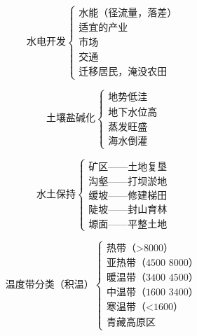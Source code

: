 \documentclass[UTF8]{ctexart}
\begin{document}
\begin{multicols}{2}

    \[
        \textbf{水电开发}
        \begin{cases}
            \text{水能（径流量，落差）}\\
            \text{适宜的产业}\\
            \text{市场}\\
            \text{交通}\\
            \text{迁移居民，淹没农田}
        \end{cases}
    \]

    \[
        \textbf{土壤盐碱化}
        \begin{cases}
            \text{地势低洼}\\
            \text{地下水位高}\\
            \text{蒸发旺盛}\\
            \text{海水倒灌}
        \end{cases}
    \]

\end{multicols}

\par

\begin{multicols}{2}

    \[
        \textbf{水土保持}
        \begin{cases}
            \text{矿区——土地复垦}\\
            \text{沟壑——打坝淤地}\\
            \text{缓坡——修建梯田}\\
            \text{陡坡——封山育林}\\
            \text{塬面——平整土地}
        \end{cases}
    \]

    \[
        \textbf{温度带分类（积温）}
        \begin{cases}
            \text{热带（>8000）}\\
            \text{亚热带（4500~8000）}\\
            \text{暖温带（3400~4500）}\\
            \text{中温带（1600~3400）}\\
            \text{寒温带（<1600）}\\
            \text{青藏高原区}
        \end{cases}
    \]

\end{multicols}
\end{document}
